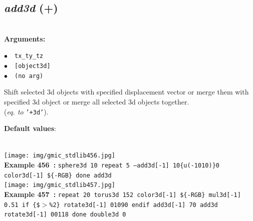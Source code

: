\documentclass[a4paper,10.5pt,twoside]{book}
\def\comma{\discretionary{,}{}{,}}
\newcommand{\Cb}[1]{\textcolor{cb}{#1}}
\newcommand{\Cc}[1]{\textcolor{cc}{#1}}
\begin{document}
\subsection{\emph{add3d} (+)}\vspace*{-0.7em}
~\\\textbf{\Cb{Arguments: }}\begin{flushleft}
{\small \Cb{\hspace*{0.5cm}$\bullet$~~\texttt{tx{\comma}\_ty{\comma}\_tz}}}~~~\\
{\small \Cb{\hspace*{0.5cm}$\bullet$~~\texttt{[object3d]}}}~~~\\
{\small \Cb{\hspace*{0.5cm}$\bullet$~~\texttt{(no arg)}}}\end{flushleft}
Shift selected 3d objects with specified displacement vector{\comma} or merge them with specified
3d object{\comma} or merge all selected 3d objects together.
~\\(\emph{eq. to} {\small \texttt{'+3d'}}).
\begin{flushleft}\Cc{\textbf{Default values}:\\~\\\hspace*{0.5cm}{\small $\bullet$~~\texttt{'ty=tz=0'.}}}\end{flushleft}
\begin{center}\texttt{[image: img/gmic\_stdlib456.jpg]}\\
{\footnotesize \textbf{Example 456~:} \texttt{sphere3d 10 repeat 5 --add3d[-1] 10{\comma}\{u(-10{\comma}10)\}{\comma}0 color3d[-1] \$\{-RGB\} done add3d}}
\\\texttt{[image: img/gmic\_stdlib457.jpg]}\\
{\footnotesize \textbf{Example 457~:} \texttt{repeat 20 torus3d 15{\comma}2 color3d[-1] \$\{-RGB\} mul3d[-1] 0.5{\comma}1 if \{\$$>$\%2\} rotate3d[-1] 0{\comma}1{\comma}0{\comma}90 endif add3d[-1] 70 add3d rotate3d[-1] 0{\comma}0{\comma}1{\comma}18 done double3d 0}}
\end{center}
\end{document}
